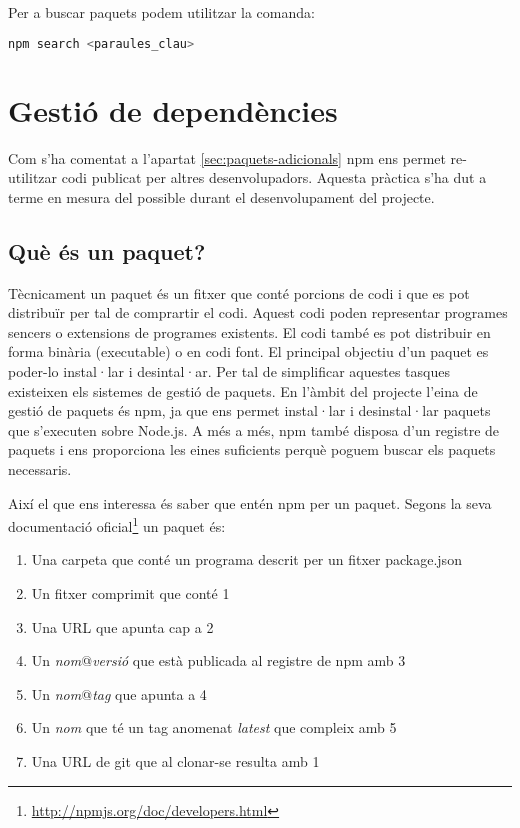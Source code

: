 Per a buscar paquets podem utilitzar la comanda: 

\begin{lstlisting}[language=bash]
npm search <paraules_clau>
\end{lstlisting}

\section{Gestió de dependències}
\label{sec:gestio-dependencies}
Com s'ha comentat a l'apartat \ref{sec:paquets-adicionals} npm ens permet re-utilitzar codi publicat per altres desenvolupadors. Aquesta pràctica s'ha dut a terme en mesura del possible durant el desenvolupament del projecte.  

\subsection{Què és un paquet?}
\label{sec:que-es-un-paquet}

Tècnicament un paquet és un fitxer que conté porcions de codi i que es pot distribuïr per tal de comprartir el codi. Aquest codi poden representar programes sencers o extensions de programes existents. El codi també es pot distribuir en forma binària (executable) o en codi font. El principal objectiu d'un paquet es poder-lo instal·lar i desintal·ar. Per tal de simplificar aquestes tasques existeixen els sistemes de gestió de paquets. En l'àmbit del projecte l'eina de gestió de paquets és npm, ja que ens permet instal·lar i desinstal·lar paquets que s'executen sobre Node.js. A més a més, npm també disposa d'un registre de paquets i ens proporciona les eines suficients perquè poguem buscar els paquets necessaris. 

Així el que ens interessa és saber que entén npm per un paquet. Segons la seva documentació oficial\footnote{\url{http://npmjs.org/doc/developers.html}} un paquet és: 

\begin{enumerate}
\item {Una carpeta que conté un programa descrit per un fitxer package.json}
\item {Un fitxer comprimit que conté 1}
\item {Una URL que apunta cap a 2}
\item {Un \emph{nom}@\emph{versió} que està publicada al registre de npm amb 3}
\item {Un \emph{nom}@\emph{tag} que apunta a 4}
\item {Un \emph{nom} que té un tag anomenat \emph{latest} que compleix amb 5}
\item {Una URL de git que al clonar-se resulta amb 1}
\end{enumerate}

